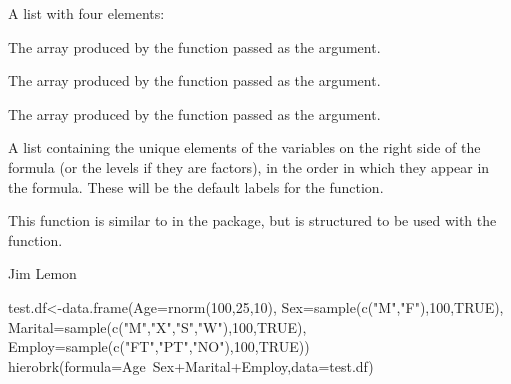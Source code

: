 \begin{Value}
A list with four elements:
\begin{ldescription}
\item[\code{mctlist}] The array produced by the function passed as the  argument.
\item[\code{lcllist}] The array produced by the function passed as the  argument.
\item[\code{ucllist}] The array produced by the function passed as the  argument.
\item[\code{barlabels}] A list containing the unique elements of the variables on the right
side of the formula (or the levels if they are factors), in the order in which they appear in the formula. These will be the default labels for the  function.
\end{ldescription}

This function is similar to  in the  package, but
is structured to be used with the  function.
\end{Value}
\begin{Author}\relax
Jim Lemon
\end{Author}
\begin{SeeAlso}\relax
{}
\end{SeeAlso}
\begin{Examples}
\begin{ExampleCode}
 test.df<-data.frame(Age=rnorm(100,25,10),
  Sex=sample(c("M","F"),100,TRUE),
  Marital=sample(c("M","X","S","W"),100,TRUE),
  Employ=sample(c("FT","PT","NO"),100,TRUE))
 hierobrk(formula=Age~Sex+Marital+Employ,data=test.df)
\end{ExampleCode}
\end{Examples}

